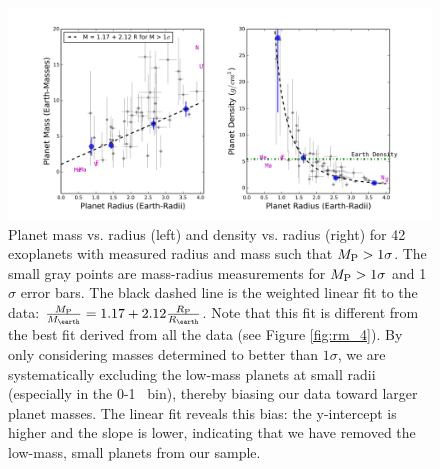 \documentclass[iop]{emulateapj}
\begin{document}
\begin{figure}[htbp] %
   \centering
    \includegraphics[width=6in]{mr_small_1sig.png} 
   \caption{\small Planet mass vs. radius (left) and density vs. radius (right) for 42 exoplanets with measured radius and mass such that $M_{\rm P} > 1\sigma$.  The small gray points are mass-radius measurements for $M_{\rm P} > 1\sigma$ and 1$\sigma$ error bars.  The black dashed line is the weighted linear fit to the data: $\frac{\mpl}{\mearth} = 1.17 + 2.12 \frac{\rpl}{\rearth}$.  Note that this fit is different from the best fit derived from all the data (see Figure \ref{fig:rm_4}).  By only considering masses determined to better than $1\sigma$, we are systematically excluding the low-mass planets at small radii (especially in the 0-1 \rearth\ bin), thereby biasing our data toward larger planet masses.  The linear fit reveals this bias: the y-intercept is higher and the slope is lower, indicating that we have removed the low-mass, small planets from our sample.}
   \label{fig:rm_4_1sig}
\end{figure}
\end{document}
